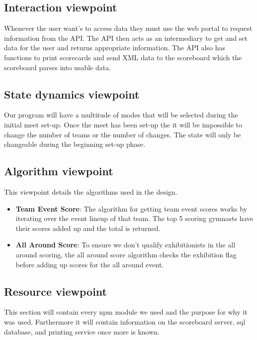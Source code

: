\documentclass[letterpaper,10pt,draftclsnofoot,onecolumn,]{article}
\begin{document}
\subsection{Interaction viewpoint}
Whenever the user want's to access data they must use the web portal to request information from the API. The API then acts as an intermediary to get and set data for the user and returns appropriate information. The API also has functions to print scorecards and send XML data to the scoreboard which the scoreboard parses into usable data.
\subsection{State dynamics viewpoint}
Our program will have a multitude of modes that will be selected during the initial meet set-up. Once the meet has been set-up the it will be impossible to change the number of teams or the number of changes. The state will only be changeable during the beginning set-up phase.
\subsection{Algorithm viewpoint}
This viewpoint details the algorithms used in the design.
\begin{itemize}
    \item \textbf{Team Event Score}: The algorithm for getting team event scores works by iterating over the event lineup of that team. The top 5 scoring gymnasts have their scores added up and the total is returned.
    \item \textbf{All Around Score}: To ensure we don't qualify exhibitionists in the all around scoring, the all around score algorithm checks the exhibition flag before adding up scores for the all around event.
\end{itemize}

\subsection{Resource viewpoint}
This section will contain every npm module we used and the purpose for why it was used. Furthermore it will contain information on the scoreboard server, sql database, and printing service once more is known.
\end{document}
